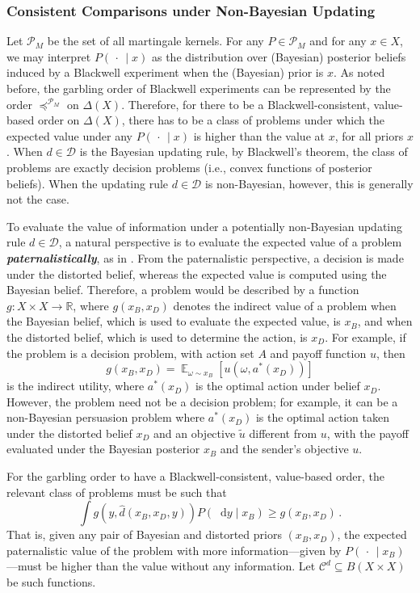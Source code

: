 \documentclass[12pt,letterpaper]{article}
\newenvironment{original}{\color{black}}{}
\theoremstyle{plain}
\theoremstyle{definition}
\theoremstyle{remark}
\DeclareMathOperator{\E}{\mathds{E}}
\newcommand{\Pc}{\mathcal{P}}
\newcommand{\C}{\mathcal{C}}
\newcommand{\R}{\mathds{R}}
\renewcommand*\d{\mathop{}\!\mathrm{d}}
\theoremstyle{definition}
\begin{document}
\subsubsection{Consistent Comparisons under Non-Bayesian Updating}
\begin{original}
Let $\Pc_M$ be the set of all martingale kernels. For any $P \in \Pc_M$ and for any $x \in X$, we may interpret $P(\,\cdot\,\mid x)$ as the distribution over (Bayesian) posterior beliefs induced by a Blackwell experiment when the (Bayesian) prior is $x$. As noted before, the garbling order of Blackwell experiments can be represented by the order $\preceq^{\Pc_M}$ on $\Delta(X)$. Therefore, for there to be a Blackwell-consistent, value-based order on $\Delta(X)$, there has to be a class of problems under which the expected value under any $P(\,\cdot\,\mid x)$ is higher than the value at $x$, for all priors $x$. When $d \in \mathcal{D}$ is the Bayesian updating rule, by Blackwell's theorem, the class of problems are exactly decision problems (i.e., convex functions of posterior beliefs). When the updating rule $d \in \mathcal{D}$ is non-Bayesian, however, this is generally not the case.

To evaluate the value of information under a potentially non-Bayesian updating rule $d \in \mathcal{D}$, a natural perspective is to evaluate the expected value of a problem \emph{\textbf{paternalistically}}, as in \citet{whitmeyerforthcomingBlackwell}. From the paternalistic perspective, a decision is made under the distorted belief, whereas the expected value is computed using the Bayesian belief. Therefore, a problem would be described by a function $g:X \times X \to \R$, where $g(x_B,x_D)$ denotes the indirect value of a problem when the Bayesian belief, which is used to evaluate the expected value, is $x_B$, and when the distorted belief, which is used to determine the action, is $x_D$. For example, if the problem is a decision problem, with action set $A$ and payoff function $u$, then
\[
g(x_B,x_D)=\E_{\omega \sim x_B} [u(\omega,a^*(x_D))]
\]
is the indirect utility, where $a^*(x_D)$ is the optimal action under belief $x_D$. However, the problem need not be a decision problem; for example, it can be a non-Bayesian persuasion problem where $a^*(x_D)$ is the optimal action taken under the distorted belief $x_D$ and an objective $\tilde{u}$ different from $u$, with the payoff evaluated under the Bayesian posterior $x_B$ and the sender's objective $u$.

For the garbling order to have a Blackwell-consistent, value-based order, the relevant class of problems must be such that
\[
\int g(y, \hat{d}(x_B,x_D,y))P(\d y\mid x_B) \geq g(x_B,x_D)\,.
\]
That is, given any pair of Bayesian and distorted priors $(x_B,x_D)$, the expected paternalistic value of the problem with more information---given by $P(\,\cdot\,\mid x_B)$---must be higher than the value without any information. Let $\C^d \subseteq B(X \times X)$ be such functions.


\end{original}
\end{document}
